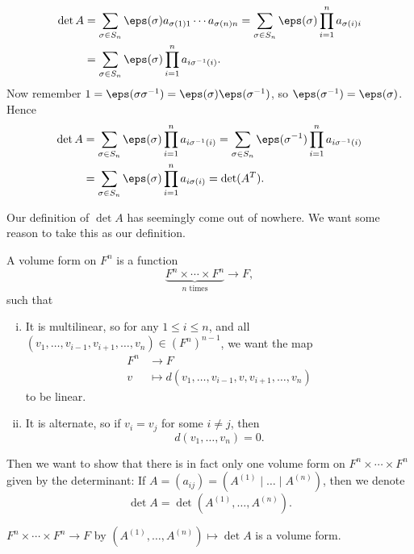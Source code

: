 \documentclass[12pt]{article}
\begin{document}
\begin{proofbox}
	\begin{align*}
		\det A &= \sum_{\sigma \in S_n} \eps(\sigma) a_{\sigma(1) 1} \cdots a_{\sigma(n) n} = \sum_{\sigma \in S_n} \eps(\sigma) \prod_{i = 1}^{n} a_{\sigma(i) i} \\
		       &= \sum_{\sigma \in S_n} \eps(\sigma) \prod_{i = 1}^{n} a_{i \sigma^{-1}(i)}.
	\end{align*}
	Now remember $1 = \eps(\sigma \sigma^{-1}) = \eps(\sigma) \eps(\sigma^{-1})$, so $\eps(\sigma^{-1}) = \eps(\sigma)$. Hence
	\begin{align*}
		\det A &= \sum_{\sigma \in S_n} \eps(\sigma) \prod_{i = 1}^{n} a_{i \sigma^{-1}(i)} = \sum_{\sigma \in S_n} \eps(\sigma^{-1}) \prod_{i = 1}^{n}a_{i \sigma^{-1}(i)} \\
		       &= \sum_{\sigma \in S_n} \eps(\sigma) \prod_{i = 1}^{n} a_{i \sigma(i)} = \det (A^{T}).
	\end{align*}
\end{proofbox}

Our definition of $\det A$ has seemingly come out of nowhere. We want some reason to take this as our definition.

\begin{definition}
	A volume form on $F^{n}$ is a function
	\[
		\underbrace{F^{n} \times \cdots \times F^{n}}_{n \text{ times}} \to F
	,\]
	such that
	\begin{enumerate}[(i)]
		\item It is multilinear, so for any $1 \leq i \leq n$, and all $(v_1, \ldots, v_{i-1}, v_{i+1}, \ldots, v_n) \in (F^{n})^{n-1}$, we want the map
			\begin{align*}
				F^{n} &\to F \\
				v &\mapsto d(v_1, \ldots, v_{i-1}, v, v_{i+1}, \ldots, v_n)
			\end{align*}
			to be linear.
		\item It is alternate, so if $v_i = v_j$ for some $i \neq j$, then
			\[
				d(v_1, \ldots, v_n) = 0
			.\]
	\end{enumerate}
\end{definition}

Then we want to show that there is in fact only one volume form on $F^{n} \times \cdots \times F^{n}$ given by the determinant: If $A = (a_{ij}) = (A^{(1)} \mid \ldots \mid A^{(n)})$, then we denote
\[
	\det A = \det(A^{(1)}, \ldots, A^{(n)})
.\]
\begin{lemma}
	$F^{n} \times \cdots \times F^{n} \to F$ by $(A^{(1)}, \ldots, A^{(n)}) \mapsto \det A$ is a volume form.
\end{lemma}
\end{document}
